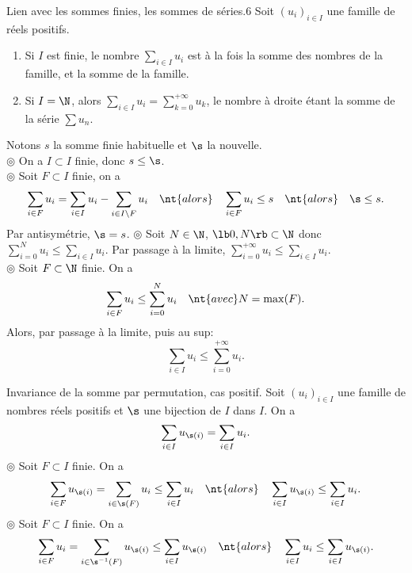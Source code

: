 \documentclass[11pt]{article}
\begin{document}
\begin{prop}{Lien avec les sommes finies, les sommes de séries.}{6}
    Soit $(u_i)_{i\in I}$ une famille de réels positifs.
    \begin{enumerate}[itemsep=-0.9 ex]
        \item Si $I$ est finie, le nombre $\sum\limits_{i\in I}u_i$ est à la fois la somme des nombres de la famille, et la somme de la famille.
        \item Si $I=\N$, alors $\sum\limits_{i\in I}u_i=\sum\limits_{k=0}^{+\infty}u_k$, le nombre à droite étant la somme de la série $\sum u_n$.
    \end{enumerate}
    \tcblower
     Notons $s$ la somme finie habituelle et $\s$ la nouvelle.\\
    $\circledcirc$ On a $I\subset I$ finie, donc $s\leq \s$.\\
    $\circledcirc$ Soit $F\subset I$ finie, on a
    \begin{equation*}
        \sum_{i\in F}u_i=\sum_{i\in I} u_i - \sum_{i\in I\setminus F}u_i\quad\nt{alors}\quad\sum_{i\in F}u_i\leq s\quad\nt{alors}\quad\s\leq s.
    \end{equation*}
    Par antisymétrie, $\s=s$.\n
    $\circledcirc$ Soit $N\in\N$, $\lb0,N\rb\subset\N$ donc \large$\sum\limits_{i=0}^Nu_i\leq\sum\limits_{i\in I}u_i$. \normalsize Par passage à la limite, \large$\sum\limits_{i=0}^{+\infty}u_i\leq\sum\limits_{i\in I}u_i$.\normalsize\\
    $\circledcirc$ Soit $F\subset\N$ finie. On a
    \begin{equation*}
        \sum_{i\in F}u_i \leq \sum_{i=0}^Nu_i\quad\nt{avec }N=\max(F).
    \end{equation*}
    Alors, par passage à la limite, puis au sup:
    \begin{equation*}
        \sum_{i\in I}u_i\leq\sum_{i=0}^{+\infty}u_i.
    \end{equation*}
\end{prop}

\begin{prop}{Invariance de la somme par permutation, cas positif.}{}
    Soit $(u_i)_{i\in I}$ une famille de nombres réels positifs et $\s$ une bijection de $I$ dans $I$. On a
    \begin{equation*}
        \sum_{i\in I}u_{\s(i)}=\sum_{i\in I}u_i.
    \end{equation*}
    \tcblower
    $\circledcirc$ Soit $F\subset I$ finie. On a
    \begin{equation*}
        \sum_{i\in F}u_{\s(i)}=\sum_{i\in\s(F)}u_i\leq\sum_{i\in I}u_i\quad\nt{alors}\quad\sum_{i\in I}u_{\s(i)}\leq\sum_{i\in I}u_i.
    \end{equation*}
    $\circledcirc$ Soit $F\subset I$ finie. On a
    \begin{equation*}
        \sum_{i\in F}u_i = \sum_{i\in\s^{-1}(F)}u_{\s(i)}\leq\sum_{i\in I}u_{\s(i)}\quad\nt{alors}\quad\sum_{i\in I}u_i\leq \sum_{i\in I}u_{\s(i)}.
    \end{equation*}
\end{prop}
\end{document}

